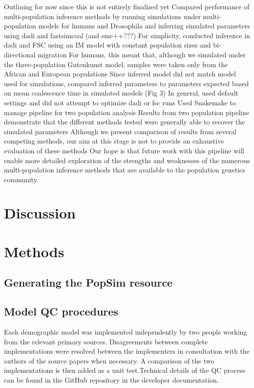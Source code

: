 \documentclass[12pt,halfline,a4paper]{ouparticle}
\begin{document}
Outlining for now since this is not entirely finalized yet Compared performance
of multi-population inference methods by running simulations under
multi-population models for humans and Drosophila and inferring simulated
parameters using dadi and fastsimcoal (and smc++???) For simplicity, conducted
inference in dadi and FSC using an IM model with constant population sizes and
bi-directional migration For humans, this meant that, although we simulated
under the three-population Gutenkunst model, samples were taken only from the
African and European populations Since inferred model did not match model used
for simulations, compared inferred parameters to parameters expected based on
mean coalescence time in simulated models (Fig 3) In general, used default
settings and did not attempt to optimize dadi or fsc runs Used Snakemake to
manage pipeline for two population analysis Results from two population pipeline
demonstrate that the different methods tested were generally able to recover the
simulated parameters Although we present comparison of results from several
competing methods, our aim at this stage is not to provide an exhaustive
evaluation of these methods Our hope is that future work with this pipeline will
enable more detailed exploration of the strengths and weaknesses of the numerous
multi-population inference methods that are available to the population genetics
community


\section*{Discussion}


\section*{Methods}
\subsection*{Generating the PopSim resource}

\subsection*{Model QC procedures}
Each demographic model was implemented independently by two people working from
the relevant primary sources. Disagreements between complete implementations
were resolved between the implementers in consultation with the authors of the
source papers when necessary. A comparison of the two implementations is then
added as a unit test.Technical details of the QC process can be found in the
GitHub repository in the developer documentation.
\end{document}
